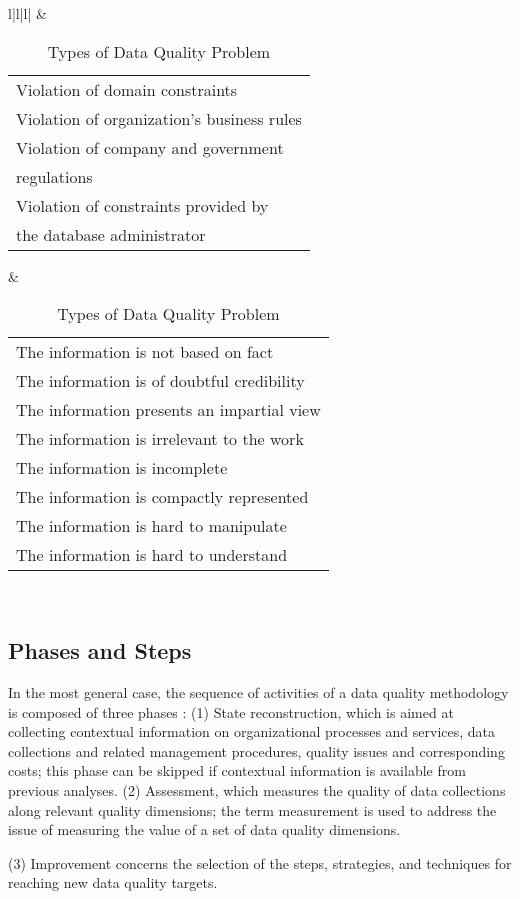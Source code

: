 \documentclass[pdftex,english,oribibl]{llncs}
\begin{document}
\begin{table}[]
\begin{tabular}{l|l|l|}
   & \begin{tabular}[c]{@{}l@{}}Violation of domain constraints \\ Violation of organization's business rules\\ Violation of company and government\\ regulations \\ Violation of constraints provided by\\  the database administrator\end{tabular}                              & \begin{tabular}[c]{@{}l@{}}The information is not based on fact \\ The information is of doubtful credibility\\ The information presents an impartial view\\ The information is irrelevant to the work\\ The information is incomplete\\ The information is compactly represented\\ The information is hard to manipulate \\ The information is hard to understand\end{tabular} \\ \hline
\end{tabular}
\caption{Types of Data Quality Problem}
\label{table:DataQualityProblem}
\end{table}

\subsection{Phases and Steps}
In the most general case, the sequence of activities of a data quality methodology is composed of three phases \cite{Batini2009MethodologiesForDataQuality}:
(1) State reconstruction, which is aimed at collecting contextual information on organizational processes and services, data collections and related management procedures, quality issues and corresponding costs; this phase can be skipped if contextual information is available from previous analyses.
(2) Assessment, which measures the quality of data collections along relevant quality dimensions; the term measurement is used to address the issue of measuring the value of a set of data quality dimensions.
\begin{comment}
The term assessment is used when such measurements are compared to reference values, in order to enable a diagnosis of quality. The term assessment is adopted in this article, consistent with the majority of methodologies, which stress the importance of the causes of poor data quality.
\end{comment}
(3) Improvement concerns the selection of the steps, strategies, and techniques for reaching new data quality targets.
\end{document}
